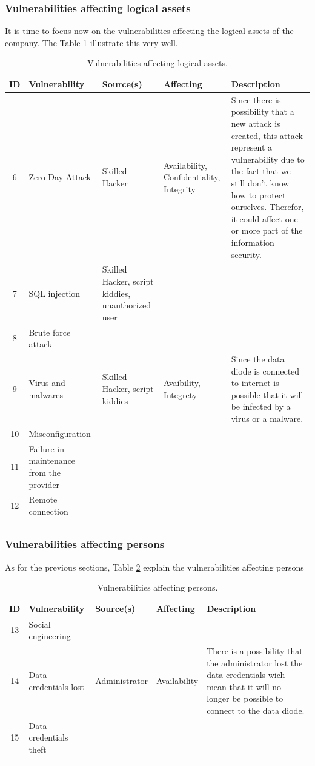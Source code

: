 \documentclass[a4paper,10pt]{article}
\begin{document}
\subsubsection{Vulnerabilities affecting logical assets}
It is time to focus now on the vulnerabilities affecting the logical assets of the company. The Table \ref{tab:logic-assets} illustrate this very well.

\begin{longtable}{|c|p{2.5cm}|p{2.5cm}|p{2.5cm}|p{6.5cm}|}
\hline
\textbf{ID}&  \textbf{Vulnerability} & \textbf{Source(s)} & \textbf{Affecting} & \textbf{Description} \\
\hline
6 & Zero Day Attack & Skilled Hacker & Availability, Confidentiality, Integrity & Since there is possibility that a new attack is created, this attack represent a vulnerability due to the fact that we still don't know how to protect ourselves. Therefor, it could affect one or more part of the information security. \\
\hline
7 &  SQL injection  & Skilled Hacker, script kiddies, unauthorized user &  & \\
\hline
8 & Brute force attack &  &  & \\
\hline
9 & Virus and malwares & Skilled Hacker, script kiddies  & Avaibility, Integrety & Since the data diode is connected to internet is possible that it will be infected by a virus or a malware. \\
\hline
10 & Misconfiguration &  &  & \\
\hline
11 &  Failure in maintenance from the provider &  &  & \\
\hline
12 &  Remote connection &  &  & \\
\hline
\caption{Vulnerabilities affecting logical assets.}
\label{tab:logic-assets}
\end{longtable}

\subsubsection{Vulnerabilities affecting persons}
As for the previous sections, Table \ref{tab:person-assets} explain the vulnerabilities affecting persons
\begin{longtable}{|c|p{2.5cm}|p{2.5cm}|p{2.5cm}|p{6.5cm}|}
\hline
\textbf{ID}&  \textbf{Vulnerability} & \textbf{Source(s)} & \textbf{Affecting} & \textbf{Description} \\
\hline
13 & Social engineering &  &  & \\
\hline
14 & Data credentials lost & Administrator & Availability  & There is a possibility that the administrator lost the data credentials wich mean that it will no longer be possible to connect to the data diode. \\
\hline
15 & Data credentials theft &  &  & \\
\hline
\caption{Vulnerabilities affecting persons.}
\label{tab:person-assets}
\end{longtable}
\end{document}
